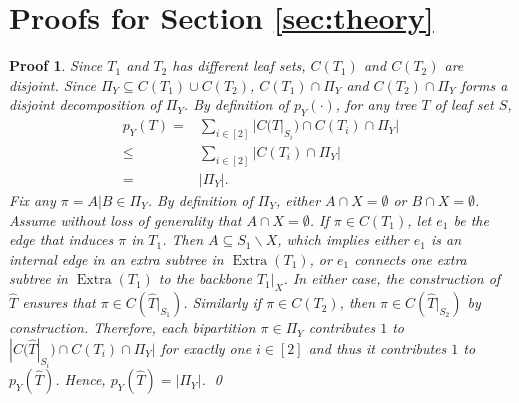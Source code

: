 \documentclass[twocolumn]{bmcart}%
\DeclareMathOperator*{\extra}{Extra}
\theoremstyle{mystyle}
\theoremstyle{proofstyle}
\newtheorem*{proof2}{Proof}
\newenvironment{proofnospace}{\begin{proof2}}{\qed \end{proof2}}
\begin{document}
\section{Proofs for Section \ref{sec:theory}}


\lemMaxPY*
\begin{proofnospace}
    Since $T_1$ and $T_2$ has different leaf sets, $C(T_1)$ and $C(T_2)$ are disjoint. Since $\Pi_Y \subseteq C(T_1)\cup C(T_2)$, $C(T_1) \cap \Pi_Y$ and $C(T_2)\cap \Pi_Y$ forms a disjoint decomposition of $\Pi_Y$. By definition of $p_Y(\cdot)$, for any tree $T$ of leaf set $S$,
    \begin{align*}
        p_Y(T)=& \sum_{i \in [2]} |C(T|_{S_i}) \cap C(T_i) \cap \Pi_Y|\\
        \le& \sum_{i\in[2]}|C(T_i) \cap \Pi_Y|\\
        =& |\Pi_Y|.
    \end{align*}
    Fix any $\pi = A|B \in \Pi_Y$. By definition of $\Pi_Y$, either $A \cap X = \emptyset$ or $B \cap X = \emptyset$. Assume without loss of generality that $A \cap X = \emptyset$. If $\pi \in C(T_1)$, let $e_1$ be the edge that induces $\pi$ in $T_1$. Then $A \subseteq S_1 \backslash X$, which implies either $e_1$ is an internal edge in an extra subtree in $\extra(T_1)$, or $e_1$ connects one extra subtree in $\extra(T_1)$ to the backbone $T_1|_X$. In either case, the construction of $\hat{T}$ ensures that $\pi \in C(\hat{T}|_{S_1})$. Similarly if $\pi \in C(T_2)$, then $\pi \in C(\hat{T}|_{S_2})$ by construction. Therefore, each bipartition $\pi \in \Pi_Y$ contributes $1$ to $|C(\hat{T}|_{S_i}) \cap C(T_i) \cap \Pi_Y|$ for exactly one $i \in [2]$ and thus it contributes $1$ to $p_Y(\hat{T})$. Hence, $p_Y(\hat{T}) = |\Pi_Y|$.
\end{proofnospace}
\end{document}

